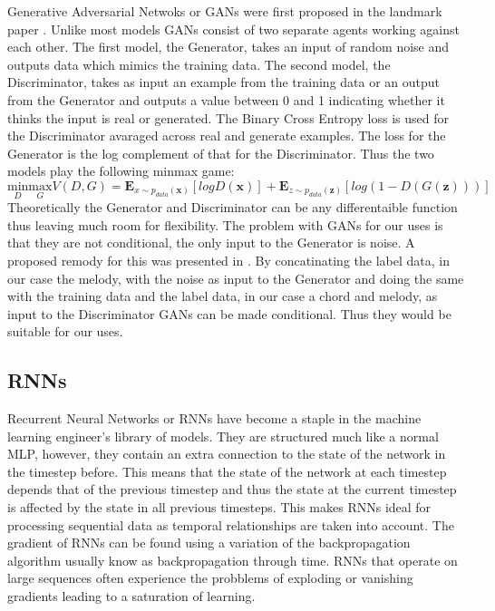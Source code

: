 Generative Adversarial Netwoks or GANs were first proposed in the landmark paper \cite{GANs}. Unlike most models GANs consist of two separate agents working against each other.
The first model, the Generator, takes an input of random noise and outputs data which mimics the training data. 
The second model, the Discriminator, takes as input an example from the training data or an output from the Generator and outputs a value between 0 and 1 indicating whether it thinks the input is real or generated.
The Binary Cross Entropy loss is used for the Discriminator avaraged across real and generate examples. The loss for the Generator is the log complement of that for the Discriminator. Thus the two models play the following minmax game:
\begin{equation}
\underset{D}{\text{min}} \underset{G}{\text{max}} V(D,G) = \mathbf{E}_{x\sim p_{data}(\mathbf{x})}[logD(\mathbf{x})] + \mathbf{E}_{z\sim p_{data}(\mathbf{z})}[log(1-D(G(\mathbf{z})))]
\end{equation} 
Theoretically the Generator and Discriminator can be any differentaible function thus leaving much room for flexibility.
The problem with GANs for our uses is that they are not conditional, the only input to the Generator is noise. A proposed remody for this was presented in \cite{CGANs}.
By concatinating the label data, in our case the melody, with the noise as input to the Generator and doing the same with the training data and the label data, in our case a chord and melody, as input to the Discriminator GANs can be made conditional. 
Thus they would be suitable for our uses. 
\subsection{RNNs}

Recurrent Neural Networks or RNNs have become a staple in the machine learning engineer's library of models. 
They are structured much like a normal MLP, however, they contain an extra connection to the state of the network in the timestep before.
This means that the state of the network at each timestep depends that of the previous timestep and thus the state at the current timestep is affected by the state in all previous timesteps.
This makes RNNs ideal for processing sequential data as temporal relationships are taken into account.
The gradient of RNNs can be found using a variation of the backpropagation algorithm usually know as backpropagation through time.
RNNs that operate on large sequences often experience the probblems of exploding or vanishing gradients leading to a saturation of learning.

